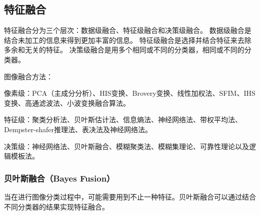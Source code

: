 \begin{comment}
\subsection{经典特征描述方法}

\subsubsection{SIFT特征}

\subsubsection{HOG特征}

\subsubsection{LBP特征}

\subsubsection{Shape Context}

\subsubsection{Fisher Vector}
\end{comment}

\subsection{特征融合}
特征融合分为三个层次：数据级融合、特征级融合和决策级融合。
数据级融合是结合未加工的信息来得到更加丰富的信息。
特征级融合是选择并结合特征来去除多余和无关的特征。
决策级融合是用多个相同或不同的分类器，相同或不同的分类器。

图像融合方法：

像素级：PCA（主成分分析）、HIS变换、Brovery变换、线性加权法、SFIM、IHS变换、高通滤波法、小波变换融合算法。

特征级：聚类分析法、贝叶斯估计法、信息熵法、神经网络法、带权平均法、Dempster-shafer推理法、表决法及神经网络法。

决策级：神经网络法、贝叶斯融合、模糊聚类法、模糊集理论、可靠性理论以及逻辑模板法。

\subsubsection{贝叶斯融合（Bayes Fusion）}
当在进行图像分类过程中，可能需要用到不止一种特征。贝叶斯融合可以通过结合不同分类器的结果实现特征融合。

